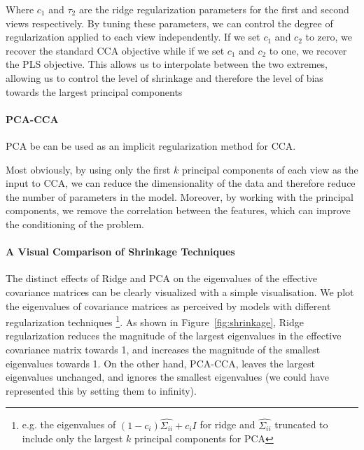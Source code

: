 Where $c_1$ and $\tau_2$ are the ridge regularization parameters for the first and second views respectively.
By tuning these parameters, we can control the degree of regularization applied to each view independently.
If we set $c_1$ and $c_2$ to zero, we recover the standard CCA objective while if we set $c_1$ and $c_2$ to one, we recover the PLS objective.
This allows us to interpolate between the two extremes, allowing us to control the level of shrinkage and therefore the level of bias towards the largest principal components

\paragraph{PCA-CCA} PCA be can be used as an implicit regularization method for CCA.

Most obviously, by using only the first \( k \) principal components of each view as the input to CCA, we can reduce the dimensionality of the data and therefore reduce the number of parameters in the model.
Moreover, by working with the principal components, we remove the correlation between the features, which can improve the conditioning of the problem.

\paragraph{A Visual Comparison of Shrinkage Techniques}

The distinct effects of Ridge and PCA on the eigenvalues of the effective covariance matrices can be clearly visualized with a simple visualisation.
We plot the eigenvalues of covariance matrices as perceived by models with different regularization techniques \footnote{e.g. the eigenvalues of $(1 - c_i) \hat{\Sigma_{ii}} + c_i I$ for ridge and $\hat{\Sigma_{ii}}$ truncated to include only the largest $k$ principal components for PCA}.
As shown in Figure~\ref{fig:shrinkage}, Ridge regularization reduces the magnitude of the largest eigenvalues in the effective covariance matrix towards 1, and increases the magnitude of the smallest eigenvalues towards 1.
On the other hand, PCA-CCA, leaves the largest eigenvalues unchanged, and ignores the smallest eigenvalues (we could have represented this by setting them to infinity).

